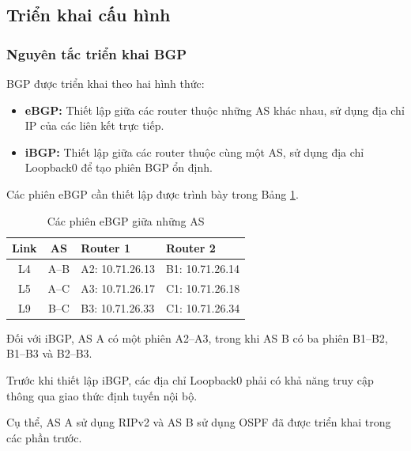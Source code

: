 \subsection{Triển khai cấu hình}

\subsubsection{Nguyên tắc triển khai BGP}

BGP được triển khai theo hai hình thức:

\begin{itemize}

    \item \textbf{eBGP:}
    Thiết lập giữa các router thuộc
    những AS khác nhau, sử dụng
    địa chỉ IP của các liên kết trực tiếp.

    \item \textbf{iBGP:}
    Thiết lập giữa các router thuộc
    cùng một AS, sử dụng địa chỉ
    Loopback0 để tạo phiên BGP ổn định.

\end{itemize}

Các phiên eBGP cần thiết lập
được trình bày trong Bảng
\ref{tab:partD-ebgp}.

\begin{table}[H]
\centering
\caption{Các phiên eBGP giữa những AS}
\label{tab:partD-ebgp}
\small
\begin{tabularx}{\textwidth}{c c X X}
\toprule
\textbf{Link} &
\textbf{AS} &
\textbf{Router 1} &
\textbf{Router 2} \\
\midrule
L4 & A--B &
A2: 10.71.26.13 &
B1: 10.71.26.14 \\

L5 & A--C &
A3: 10.71.26.17 &
C1: 10.71.26.18 \\

L9 & B--C &
B3: 10.71.26.33 &
C1: 10.71.26.34 \\
\bottomrule
\end{tabularx}
\end{table}

Đối với iBGP, AS A có một phiên
A2--A3, trong khi AS B có ba phiên
B1--B2, B1--B3 và B2--B3.

Trước khi thiết lập iBGP,
các địa chỉ Loopback0 phải có
khả năng truy cập thông qua
giao thức định tuyến nội bộ.

Cụ thể, AS A sử dụng RIPv2
và AS B sử dụng OSPF đã được
triển khai trong các phần trước.



